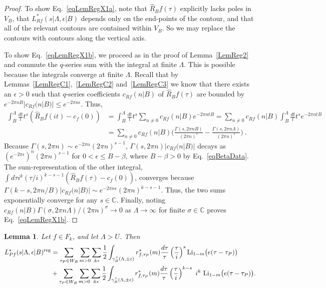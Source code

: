 \documentclass[11pt,a4paper]{article}
\newcommand{\g}{\gamma}
\newcommand{\e}{\epsilon}
\newcommand{\G}{\Gamma}
\newcommand{\La}{\Lambda}
\newtheorem{lem}[thm]{Lemma}
\def\C{\mathbb{C}}
\newcommand{\reg}{{\rm reg}}
\newcommand{\RF}{\widehat{R}} 				%
\begin{document}
\begin{proof}
To show Eq.~\eqref{eqLemRegX1a}, note that $\RF_B f(\tau)$ explicitly lacks poles in $V_B$, that $L_{Rf}^*(s|\La,\e|B)$ depends only on the end-points of the contour, and that all of the relevant contours are contained within $V_B$. So we may replace the contours with contours along the vertical axis. 

To show Eq.~\eqref{eqLemRegX1b}, we proceed as in the proof of Lemma~\ref{LemReg2} and commute the $q$-series sum with the integral at finite $\La$. This is possible because the integrals converge at finite $\La$. Recall that by Lemmas~\ref{LemRegC1},~\ref{LemRegC2} and~\ref{LemRegC3} we know that there exists an $\e > 0$ such that $q$-series coefficients $c_{Rf}(n|B)$ of $\RF_B f(\tau)$ are bounded by $e^{-2\pi n B} |c_{Rf}(n|B)| \leq e^{-2 \pi n \e}$. Thus,
\begin{align}
\int_{B}^{\La} \frac{dt}{t} t^{s} (\RF_B f(i t)-c_f(0)) 
&= \int_{B}^{\La} \frac{dt}{t} t^{s} \sum_{n \neq 0} c_{Rf}(n|B) e^{-2\pi n t B} = \sum_{n \neq 0} c_{Rf}(n|B) \int_{B}^{\La} \frac{dt}{t} t^{s} e^{-2\pi n t B} \nonumber\\
&
= \sum_{n \neq 0} c_{Rf}(n|B) \bigg(\frac{\G(s,2\pi n B)}{(2\pi n)^s}-\frac{\G(s,2\pi n \La)}{(2\pi n)^s}\bigg)~.
\end{align}
Because $\G(s,2\pi n) \sim e^{-2 \pi n} (2 \pi n)^{s-1}$, $\G(s,2\pi n) |c_{Rf}(n|B)|$ decays as $(e^{-2 \pi \e})^n(2 \pi n)^{s-1}$ for $0<\e \leq B-\beta$, where $B - \beta>0$ by Eq.~\eqref{eqBetaData}. The sum-representation of the other integral, $\int d\tau i^k (\tau/i)^{k-s-1} (\RF_B f(\tau) - c_f(0))$, converges because $\G(k-s,2\pi n/B)|c_{Rf}(n|B)| \sim e^{-2 \pi n \e}(2 \pi n)^{k-s-1}$. Thus, the two sums exponentially converge for any $s \in \C$. Finally, noting $c_{Rf}(n|B) \G(\sigma,2 \pi n \La)/(2 \pi n)^{\sigma} \to 0$ as $\La \to \infty$ for finite $\sigma \in \C$ proves Eq.~\eqref{eqLemRegX1b}.
\end{proof}

\begin{lem}\label{LemRegX2}
Let $f \in F_k$, and let $\La > U$. Then
\begin{align}
L_{Pf}^*(s|\La,\e|B)^\reg 
&= \sum_{\tau_P \in W_B} \sum_{m > 0} \sum_{\pm \e}\frac{1}{2} \int_{\g_B^{+}(\Lambda,\pm\e)} r^*_{f,\tau_P}(m)  \frac{d\tau}{\tau} \left( \frac{\tau}{i}\right)^s {\rm Li}_{1-m}\big(e(\tau-\tau_P)\big) \label{eqLemRegX2}
\\
&+ \sum_{\tau_P \in W_B} \sum_{m > 0} \sum_{\pm \e}\frac{1}{2} \int_{\g_B^{+}(\Lambda,\pm\e)} r^*_{f,\tau_P}(m)  \frac{d\tau}{\tau} \left( \frac{\tau}{i}\right)^{k-s}~ i^k~ {\rm Li}_{1-m}\big(e(\tau-\tau_P)\big). \nonumber
\end{align}
\end{lem}
\end{document}
